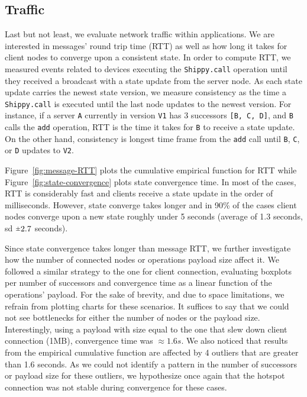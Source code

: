 \subsection{Traffic}
\label{sub:eval:traffic}


Last but not least, we evaluate network traffic within \APIshort applications.
We are interested in messages' round trip time (RTT) as well as how long it takes for client nodes to converge upon a consistent state.
In order to compute RTT, we measured events related to devices executing the \texttt{Shippy.call} operation until they received a broadcast with a state update from the server node.
As each state update carries the newest state version, we measure consistency as the time a \texttt{Shippy.call} is executed until the last node updates to the newest version.
For instance, if a server \texttt{A} currently in version \texttt{V1} has 3 successors \texttt{[B, C, D]}, and \texttt{B} calls the \texttt{add} operation, RTT is the time it takes for \texttt{B} to receive a state update.
On the other hand, consistency is longest time frame from the \texttt{add} call until \texttt{B}, \texttt{C}, or \texttt{D} updates to \texttt{V2}.


Figure~\ref{fig:message-RTT} plots the cumulative empirical function for RTT while Figure~\ref{fig:state-convergence} plots state convergence time.
In most of the cases, RTT is considerably fast and clients receive a state update in the order of milliseconds.
However, state converge takes longer and in 90\% of the cases client nodes converge upon a new state roughly under 5 seconds (average of 1.3 seconds, sd $\rpm 2.7$ seconds).


Since state convergence takes longer than message RTT, we further investigate how the number of connected nodes or operations payload size affect it.
We followed a similar strategy to the one for client connection, evaluating boxplots per number of successors and convergence time as a linear function of the operations' payload.
For the sake of brevity, and due to space limitations, we refrain from plotting charts for these scenarios.
It suffices to say that we could not see bottlenecks for either the number of nodes or the payload size. 
Interestingly, using a payload with size equal to the one that slew down client connection (1MB), convergence time was $\approx 1.6s$.
We also noticed that results from the empirical cumulative function are affected by 4 outliers that are greater than 1.6 seconds.
As we could not identify a pattern in the number of successors or payload size for these outliers, we hypothesize once again that the hotspot connection was not stable during convergence for these cases.






